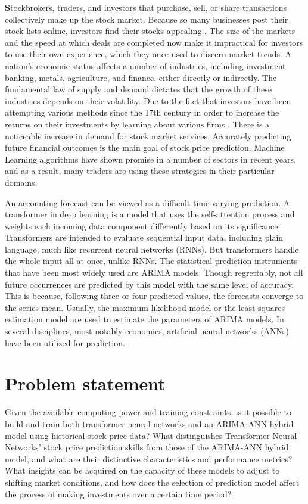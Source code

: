 \textbf
Stockbrokers, traders, and investors that purchase, sell, or share transactions 
collectively make up the stock market. Because so many businesses post their stock lists 
online, investors find their stocks appealing \cite{bhattacharjee2019stock}. The size of the 
markets and the speed at which deals are completed now make it impractical for investors to use 
their own experience, which they once used to discern market trends. A nation's economic status 
affects a number of industries, including investment banking, metals, agriculture, and finance, 
either directly or indirectly. The fundamental law of supply and demand dictates that the 
growth of these industries depends on their volatility. Due to the fact that investors have 
been attempting various methods since the 17th century in order to increase the returns on their 
investments by learning about various firms \cite{mehta2021stock}. There is a noticeable 
increase in demand for stock market services. Accurately predicting future financial outcomes is the 
main goal of stock price prediction. Machine Learning algorithms have shown promise in a number 
of sectors in recent years, and as a result, many traders are using these strategies in their 
particular domains. 

An accounting forecast can be viewed as a difficult time-varying prediction. A transformer in 
deep learning is a model that uses the self-attention process and weights each incoming data 
component differently based on its significance. Transformers are intended to evaluate 
sequential input data, including plain language, much like recurrent neural networks (RNNs). 
But transformers handle the whole input all at once, unlike RNNs. The statistical prediction 
instruments that have been most widely used are ARIMA models. Though regrettably, not all 
future occurrences are predicted by this model with the same level of accuracy. This is 
because, following three or four predicted values, the forecasts converge to the series mean. 
Usually, the maximum likelihood model or the least squares estimation model are used to 
estimate the parameters of ARIMA models. In several disciplines, most notably economics, 
artificial neural networks (ANNs) have been utilized for prediction. 

\section{Problem statement}
\label{sec:intro_prob_art}
Given the available computing power and training constraints, is it possible to build and train 
both transformer neural networks and an ARIMA-ANN hybrid model using historical stock price 
data? What distinguishes Transformer Neural Networks' stock price prediction skills from those 
of the ARIMA-ANN hybrid model, and what are their distinctive characteristics and performance 
metrics? What insights can be acquired on the capacity of these models to adjust to shifting 
market conditions, and how does the selection of prediction model affect the process of making 
investments over a certain time period?

